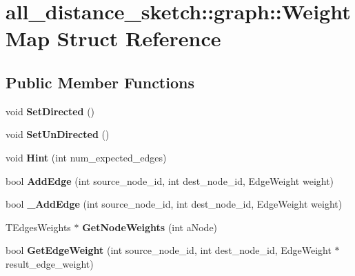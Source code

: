 \hypertarget{structall__distance__sketch_1_1graph_1_1WeightMap}{}\section{all\+\_\+distance\+\_\+sketch\+:\+:graph\+:\+:Weight\+Map Struct Reference}
\label{structall__distance__sketch_1_1graph_1_1WeightMap}
\subsection*{Public Member Functions}
\begin{DoxyCompactItemize}
\item 
\hypertarget{structall__distance__sketch_1_1graph_1_1WeightMap_acfff7441a01628a196d7ff823fd0b47c}{}void {\bfseries Set\+Directed} ()\label{structall__distance__sketch_1_1graph_1_1WeightMap_acfff7441a01628a196d7ff823fd0b47c}

\item 
\hypertarget{structall__distance__sketch_1_1graph_1_1WeightMap_abf29a407336fb548793703dc4ae2d731}{}void {\bfseries Set\+Un\+Directed} ()\label{structall__distance__sketch_1_1graph_1_1WeightMap_abf29a407336fb548793703dc4ae2d731}

\item 
\hypertarget{structall__distance__sketch_1_1graph_1_1WeightMap_a1e22559ec814a84fd548abad39cca2f3}{}void {\bfseries Hint} (int num\+\_\+expected\+\_\+edges)\label{structall__distance__sketch_1_1graph_1_1WeightMap_a1e22559ec814a84fd548abad39cca2f3}

\item 
\hypertarget{structall__distance__sketch_1_1graph_1_1WeightMap_a4a09f3089a9385f885a026559d2032eb}{}bool {\bfseries Add\+Edge} (int source\+\_\+node\+\_\+id, int dest\+\_\+node\+\_\+id, Edge\+Weight weight)\label{structall__distance__sketch_1_1graph_1_1WeightMap_a4a09f3089a9385f885a026559d2032eb}

\item 
\hypertarget{structall__distance__sketch_1_1graph_1_1WeightMap_a642b7fee2be131810be6124484d14498}{}bool {\bfseries \+\_\+\+Add\+Edge} (int source\+\_\+node\+\_\+id, int dest\+\_\+node\+\_\+id, Edge\+Weight weight)\label{structall__distance__sketch_1_1graph_1_1WeightMap_a642b7fee2be131810be6124484d14498}

\item 
\hypertarget{structall__distance__sketch_1_1graph_1_1WeightMap_a2bdcffb93ebf3c4be297c2a370eaca97}{}T\+Edges\+Weights $\ast$ {\bfseries Get\+Node\+Weights} (int a\+Node)\label{structall__distance__sketch_1_1graph_1_1WeightMap_a2bdcffb93ebf3c4be297c2a370eaca97}

\item 
\hypertarget{structall__distance__sketch_1_1graph_1_1WeightMap_a483338293d9a4749a6e919735d6c934e}{}bool {\bfseries Get\+Edge\+Weight} (int source\+\_\+node\+\_\+id, int dest\+\_\+node\+\_\+id, Edge\+Weight $\ast$result\+\_\+edge\+\_\+weight)\label{structall__distance__sketch_1_1graph_1_1WeightMap_a483338293d9a4749a6e919735d6c934e}

\end{DoxyCompactItemize}
